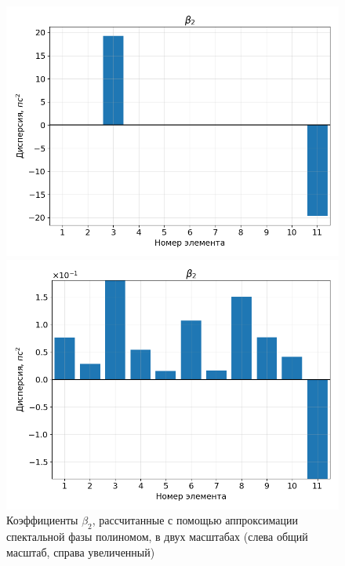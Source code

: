 \documentclass[12pt]{article}
\begin{document}
\begin{figure}[h!]
    \centering
    \begin{minipage}[b]{0.5\textwidth}
        \includegraphics[width=\linewidth]{Images/Gauss Pulse/Беты/beta_2_full}
    \end{minipage}%
    \begin{minipage}[b]{0.5\textwidth}
        \includegraphics[width=\linewidth]{Images/Gauss Pulse/Беты/beta_2_cut}
    \end{minipage}

    \caption{Коэффициенты $\beta_2$, рассчитанные с помощью аппроксимации спектальной фазы полиномом,
     в двух масштабах (слева общий масштаб, справа увеличенный)}
    \label{fig:both}
\end{figure}
\end{document}
